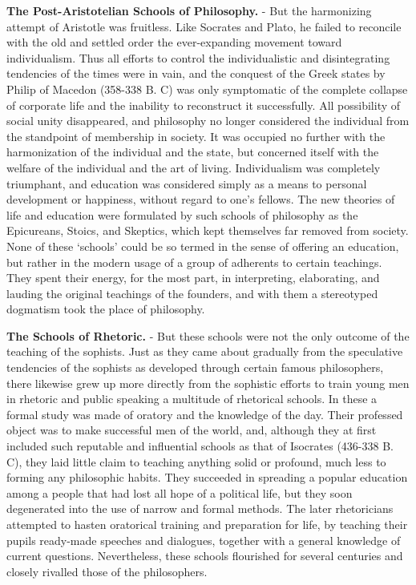 \documentclass[
]{book}
\begin{document}
\textbf{The Post-Aristotelian Schools of Philosophy.} - But the harmonizing attempt of Aristotle was fruitless. Like Socrates and Plato, he failed to reconcile with the old and settled order the ever-expanding movement toward individualism. Thus all efforts to control the individualistic and disintegrating tendencies of the times were in vain, and the conquest of the Greek states by Philip of Macedon (358-338 B. C) was only symptomatic of the complete collapse of corporate life and the inability to reconstruct it successfully. All possibility of social unity disappeared, and philosophy no longer considered the individual from the standpoint of membership in society. It was occupied no further with the harmonization of the individual and the state, but concerned itself with the welfare of the individual and the art of living. Individualism was completely triumphant, and education was considered simply as a means to personal development or happiness, without regard to one's fellows. The new theories of life and education were formulated by such schools of philosophy as the Epicureans, Stoics, and Skeptics, which kept themselves far removed from society. None of these `schools' could be so termed in the sense of offering an education, but rather in the modern usage of a group of adherents to certain teachings. They spent their energy, for the most part, in interpreting, elaborating, and lauding the original teachings of the founders, and with them a stereotyped dogmatism took the place of philosophy.

\textbf{The Schools of Rhetoric.} - But these schools were not the only outcome of the teaching of the sophists. Just as they came about gradually from the speculative tendencies of the sophists as developed through certain famous philosophers, there likewise grew up more directly from the sophistic efforts to train young men in rhetoric and public speaking a multitude of rhetorical schools. In these a formal study was made of oratory and the knowledge of the day. Their professed object was to make successful men of the world, and, although they at first included such reputable and influential schools as that of Isocrates (436-338 B. C), they laid little claim to teaching anything solid or profound, much less to forming any philosophic habits. They succeeded in spreading a popular education among a people that had lost all hope of a political life, but they soon degenerated into the use of narrow and formal methods. The later rhetoricians attempted to hasten oratorical training and preparation for life, by teaching their pupils ready-made speeches and dialogues, together with a general knowledge of current questions. Nevertheless, these schools flourished for several centuries and closely rivalled those of the philosophers.
\end{document}

